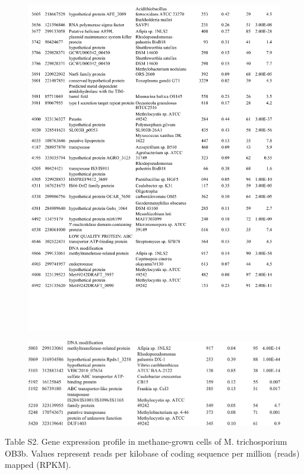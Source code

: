 \begin{figure}[H]
\centering
    \includegraphics[width=1.0\textwidth]{./tex/chapter1/figures/supplemental/TableS1f.pdf}
\end{figure}
\begin{figure}[H]
\centering
    \includegraphics[width=1.0\textwidth]{./tex/chapter1/figures/supplemental/TableS1g.pdf}
\end{figure}


Table S2. Gene expression profile in methane-grown cells of M. trichosporium OB3b. Values represent reads per kilobase of coding sequence per million (reads) mapped (RPKM).


